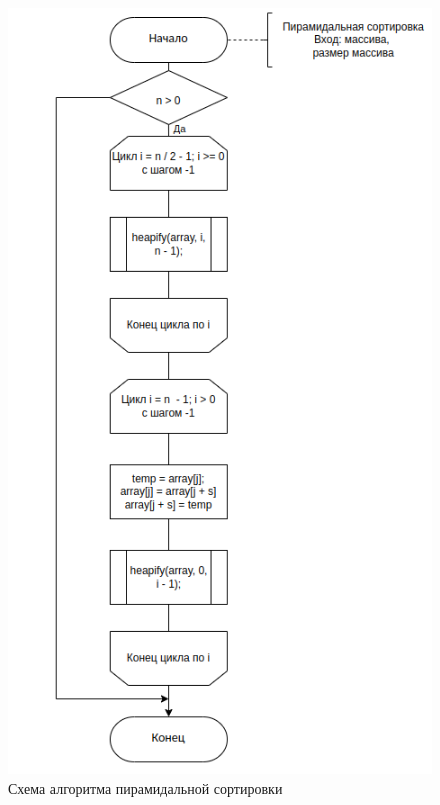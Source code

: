 \begin{figure}[h]
	\centering
	\includegraphics[height=0.8\textheight]{img/heap_1.png}
	\caption{Схема алгоритма пирамидальной сортировки}
	\label{fig:heap_1}
\end{figure}

\clearpage

